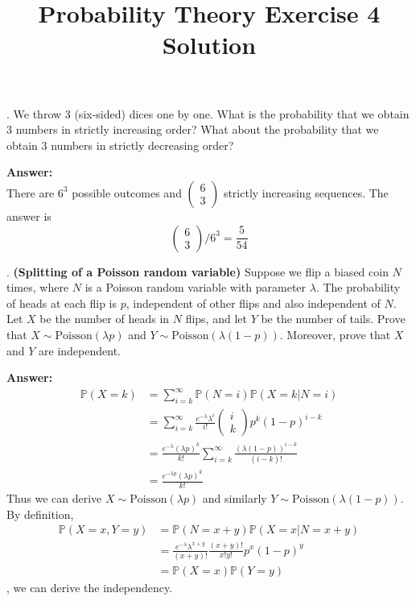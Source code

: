 \documentclass[onecolumn, 12pt]{IEEEtran}
\title{Probability Theory Exercise 4 Solution}
\begin{document}
\maketitle
{}. We throw 3 (six-sided) dices one by one. What is the probability that we obtain 3 numbers in strictly increasing order? What about the probability that we obtain 3 numbers in strictly decreasing order?

\vspace*{0.3in}
\noindent
{\bf Answer:}\\
\noindent There are $6^3$ possible outcomes and $\left(\begin{aligned}6\\3\end{aligned}\right)$ strictly increasing sequences. The answer is
\begin{equation}
\left(\begin{aligned}6\\3\end{aligned}\right) /6^3=\frac{5}{54}
\end{equation}
\noindent

\vspace*{0.3in}
. \textbf{(Splitting of a Poisson random variable)} Suppose we flip a biased coin $N$ times, where $N$ is a Poisson random variable with parameter $\lambda$. The probability of heads at each flip is $p$, 
independent of other flips and also independent of $N$. 
Let $X$ be the number of heads in $N$ flips, and let $Y$ be the number of tails. 
Prove that $X \sim \mathrm{Poisson}(\lambda p)$ 
and $Y \sim \mathrm{Poisson}(\lambda (1-p))$. 
Moreover, prove that $X$ and $Y$ are independent.

\vspace*{0.3in}
\noindent
{\bf Answer:}
\noindent 
\begin{equation}
\begin{aligned}
\mathbb{P}(X=k)&=\sum_{i=k}^{\infty}\mathbb{P}(N=i)\mathbb{P}(X=k|N=i)\\
&=\sum_{i=k}^{\infty}\frac{e^{-\lambda}\lambda^{i}}{i!}\left(\begin{aligned} i \\ k\end{aligned}\right)p^{k}(1-p)^{i-k}\\
&=\frac{e^{-\lambda}(\lambda p)^k}{k!}\sum_{i=k}^{\infty}\frac{(\lambda(1-p))^{i-k}}{(i-k)!}\\
&=\frac{e^{-\lambda p}(\lambda p)^k}{k!}
\end{aligned}
\end{equation}
Thus we can derive $X \sim \mathrm{Poisson}(\lambda p)$ and similarly $Y \sim \mathrm{Poisson}(\lambda (1-p))$.
By definition,
\begin{equation}
\begin{aligned}
\mathbb{P}(X=x, Y=y)&=\mathbb{P}(N=x+y)\mathbb{P}(X=x|N=x+y)\\
&=\frac{e^{-\lambda}\lambda^{x+y}}{(x+y)!}\frac{(x+y)!}{x!y!}p^x(1-p)^y\\
&=\mathbb{P}(X=x)\mathbb{P}(Y=y)
\end{aligned}
\end{equation}
, we can derive the independency.
\vspace*{0.3in}
\end{document}

